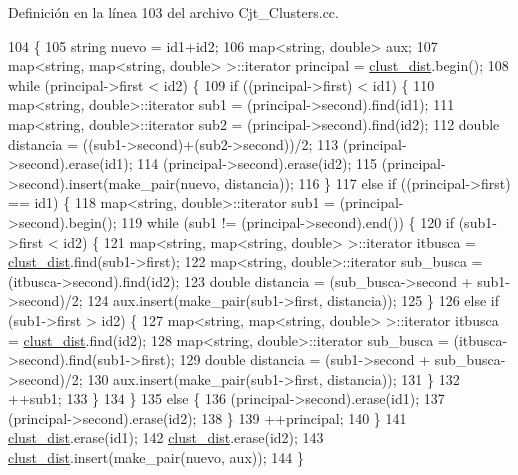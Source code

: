 Definición en la línea 103 del archivo Cjt\+\_\+\+Clusters.\+cc.


\begin{DoxyCode}
104 \{
105     \textcolor{keywordtype}{string} nuevo = id1+id2;
106     map<string, double> aux;
107     map<string, map<string, double> >::iterator principal = \hyperlink{class_cjt___clusters_a2e0931084578a4abb26d17bf289628d2}{clust\_dist}.begin();
108     \textcolor{keywordflow}{while} (principal->first < id2) \{
109         \textcolor{keywordflow}{if} ((principal->first) < id1) \{
110             map<string, double>::iterator sub1 = (principal->second).find(id1);
111             map<string, double>::iterator sub2 = (principal->second).find(id2);
112             \textcolor{keywordtype}{double} distancia = ((sub1->second)+(sub2->second))/2;
113             (principal->second).erase(id1);
114             (principal->second).erase(id2);
115             (principal->second).insert(make\_pair(nuevo, distancia));
116         \}
117         \textcolor{keywordflow}{else} \textcolor{keywordflow}{if} ((principal->first) == id1) \{
118             map<string, double>::iterator sub1 = (principal->second).begin();
119             \textcolor{keywordflow}{while} (sub1 != (principal->second).end()) \{
120                 \textcolor{keywordflow}{if} (sub1->first < id2) \{
121                     map<string, map<string, double> >::iterator itbusca = 
      \hyperlink{class_cjt___clusters_a2e0931084578a4abb26d17bf289628d2}{clust\_dist}.find(sub1->first);
122                     map<string, double>::iterator sub\_busca = (itbusca->second).find(id2);
123                     \textcolor{keywordtype}{double} distancia = (sub\_busca->second + sub1->second)/2;
124                     aux.insert(make\_pair(sub1->first, distancia));
125                 \}
126                 \textcolor{keywordflow}{else} \textcolor{keywordflow}{if} (sub1->first > id2) \{
127                     map<string, map<string, double> >::iterator itbusca = 
      \hyperlink{class_cjt___clusters_a2e0931084578a4abb26d17bf289628d2}{clust\_dist}.find(id2);
128                     map<string, double>::iterator sub\_busca = (itbusca->second).find(sub1->first);
129                     \textcolor{keywordtype}{double} distancia = (sub1->second + sub\_busca->second)/2;
130                     aux.insert(make\_pair(sub1->first, distancia));
131                 \}
132                 ++sub1;
133             \}
134         \}
135         \textcolor{keywordflow}{else} \{
136             (principal->second).erase(id1);
137             (principal->second).erase(id2);
138         \}
139         ++principal;
140     \}
141     \hyperlink{class_cjt___clusters_a2e0931084578a4abb26d17bf289628d2}{clust\_dist}.erase(id1);
142     \hyperlink{class_cjt___clusters_a2e0931084578a4abb26d17bf289628d2}{clust\_dist}.erase(id2);
143     \hyperlink{class_cjt___clusters_a2e0931084578a4abb26d17bf289628d2}{clust\_dist}.insert(make\_pair(nuevo, aux));
144 \} 
\end{DoxyCode}
\mbox{\label{class_cjt___clusters_a17f8056edf94da434c058b0a7758b93c}} 
